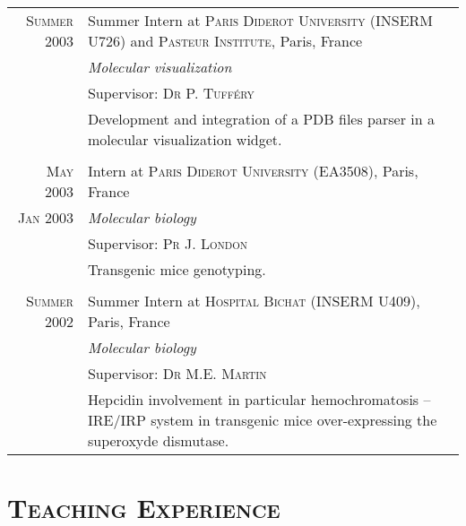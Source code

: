 \documentclass[a4paper,10pt]{article}
\begin{document}
\begin{longtable}{r|p{11cm}}
  \pagebreak
  \textsc{Summer 2003} & Summer Intern at \textsc{Paris Diderot University} (INSERM U726) and \textsc{Pasteur Institute}, Paris, France\\
  & \emph{Molecular visualization}\\
  & Supervisor: \textsc{Dr P. Tufféry}\\
  & \footnotesize{Development and integration of a PDB files parser in a molecular visualization widget.}\\
  \multicolumn{2}{c}{} \\

  \textsc{May 2003} & Intern at \textsc{Paris Diderot University} (EA3508), Paris, France\\
  \textsc{Jan 2003} & \emph{Molecular biology}\\
  & Supervisor: \textsc{Pr J. London}\\
  & \footnotesize{Transgenic mice genotyping.}\\
  \multicolumn{2}{c}{} \\

  \textsc{Summer 2002} & Summer Intern at \textsc{Hospital Bichat} (INSERM U409), Paris, France\\
  & \emph{Molecular biology}\\
  & Supervisor: \textsc{Dr M.E. Martin}\\
  & \footnotesize{Hepcidin involvement in particular hemochromatosis -- IRE/IRP system in transgenic mice over-expressing the superoxyde dismutase.}\\
  
\end{longtable}

\section{\textsc{Teaching Experience}}
\end{document}
